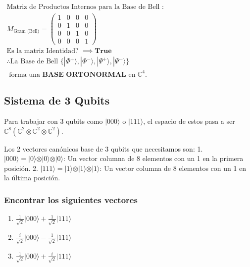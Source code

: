 \documentclass[11pt]{article}
\providecommand{\tightlist}{%
      \setlength{\itemsep}{0pt}\setlength{\parskip}{0pt}}
\begin{document}
    $\displaystyle 
\begin{aligned} 
\text{Matriz de Productos Internos para la Base de Bell } :\\
M_{\text{Gram (Bell)}} = \begin{pmatrix} 1 & 0 & 0 & 0 \\ 0 & 1 & 0 & 0 \\ 0 & 0 & 1 & 0 \\ 0 & 0 & 0 & 1 \end{pmatrix} \\
\text{Es la matriz Identidad? } \implies \mathbf{True} \\
\therefore \text{La Base de Bell } \{|\Phi^+\rangle, |\Phi^-\rangle, |\Psi^+\rangle, |\Psi^-\rangle\} \\
\text{ forma una } \mathbf{\text{BASE ORTONORMAL}} \text{ en } \mathbb{C}^4.
\end{aligned}
$

    
    \subsection{Sistema de 3 Qubits}\label{sistema-de-3-qubits}

Para trabajar con 3 qubits como \(\vert{000}\rangle\) o
\(\vert{111}\rangle\), el espacio de estos pasa a ser
\(\mathbb{C}^8 (\mathbb{C}^2 \otimes \mathbb{C}^2 \otimes \mathbb{C}^2)\).

Los 2 vectores canónicos base de 3 qubits que necesitamos son: 1.
\(\vert{000}\rangle = \vert{0}\rangle \otimes \vert{0}\rangle \otimes \vert{0}\rangle\):
Un vector columna de 8 elementos con un 1 en la primera posición. 2.
\(\vert{111}\rangle = \vert{1}\rangle \otimes \vert{1}\rangle \otimes \vert{1}\rangle\):
Un vector columna de 8 elementos con un 1 en la última posición.

\subsubsection{Encontrar los siguientes
vectores}\label{encontrar-los-siguientes-vectores}

\begin{enumerate}
\def\labelenumi{\arabic{enumi}.}
\tightlist
\item
  \(\frac{1}{\sqrt{2}}\vert{000}\rangle + \frac{1}{\sqrt{2}}\vert{111}\rangle\)
\item
  \(\frac{i}{\sqrt{2}}\vert{000}\rangle - \frac{1}{\sqrt{2}}\vert{111}\rangle\)
\item
  \(\frac{1}{\sqrt{2}}\vert{000}\rangle + \frac{i}{\sqrt{2}}\vert{111}\rangle\)
\end{enumerate}
\end{document}

